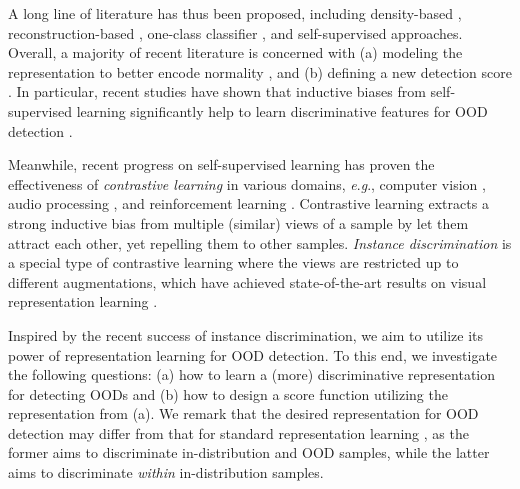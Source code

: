 \documentclass{article}
\newcommand{\eg}{\textit{e}.\textit{g}.}
\begin{document}
A long line of literature has thus been proposed, including density-based \citep{zhai2016deep,nalisnick2019deep,choi2018waic,nalisnick2019detecting,du2019implicit,ren2019likelihood,serra2020input,grathwohl2020your}, reconstruction-based \citep{schlegl2017unsupervised,zong2018deep,deecke2018anomaly,pidhorskyi2018generative,perera2019ocgan,choi2020novelty}, one-class classifier \citep{scholkopf2000support,ruff2018deep}, and self-supervised \citep{golan2018deep,hendrycks2019using_self,bergman2020classification} approaches. Overall, a majority of recent literature is concerned with (a) modeling the representation to better encode normality \citep{hendrycks2019using_pre,hendrycks2019using_self}, and (b) defining a new detection score \citep{ruff2018deep,bergman2020classification}. In particular, recent studies have shown that inductive biases from self-supervised learning significantly help to learn discriminative features for OOD detection \citep{golan2018deep,hendrycks2019using_self,bergman2020classification}.


Meanwhile, recent progress on self-supervised learning has proven the effectiveness of \emph{contrastive learning} in various domains, \eg, computer vision \citep{he2019momentum,chen2020simple}, audio processing \citep{oord2018representation}, and reinforcement learning \citep{srinivas2020curl}. Contrastive learning extracts a strong inductive bias from multiple (similar) views of a sample by let them attract each other, yet repelling them to other samples.  \emph{Instance discrimination} \citep{wu2018unsupervised} is a special type of contrastive learning where the views are restricted up to different augmentations, which have achieved state-of-the-art results on visual representation learning \citep{he2019momentum,chen2020simple}.


Inspired by the recent success of instance discrimination, we aim to utilize its power of representation learning for OOD detection. To this end, we investigate the following questions: (a) how to learn a (more) discriminative representation for detecting OODs and (b) how to design a score function utilizing the representation from (a). We remark that the desired representation for OOD detection may differ from that for standard representation learning \citep{hendrycks2019using_pre,hendrycks2019using_self}, as the former aims to discriminate in-distribution and OOD samples, while the latter aims to discriminate \textit{within} in-distribution samples. 
\end{document}

